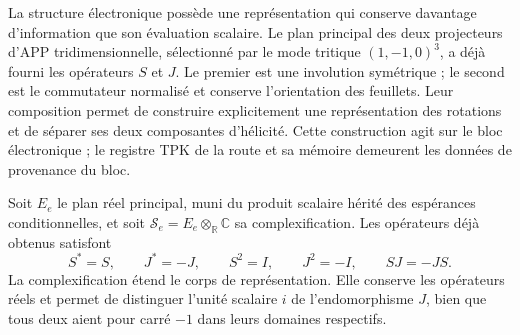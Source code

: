 La structure électronique possède une représentation qui conserve davantage
d'information que son évaluation scalaire. Le plan principal des deux
projecteurs d'APP tridimensionnelle, sélectionné par le mode tritique
\((1,-1,0)^3\), a déjà fourni les opérateurs \(S\) et \(J\).
Le premier est une involution symétrique ; le second est le commutateur
normalisé et conserve l'orientation des feuillets. Leur composition permet
de construire explicitement une représentation des rotations et de séparer ses
deux composantes d'hélicité. Cette construction agit sur le bloc
électronique ; le registre TPK de la route et sa mémoire demeurent les données
de provenance du bloc.

Soit \(E_e\) le plan réel principal, muni du produit scalaire hérité
des espérances conditionnelles, et soit
\(\mathscr S_e=E_e\otimes_{\mathbb R}\mathbb C\) sa complexification.
Les opérateurs déjà obtenus satisfont
\[
 S^*=S,\qquad J^*=-J,\qquad
 S^2=I,\qquad J^2=-I,\qquad SJ=-JS.
\]
La complexification étend le corps de représentation. Elle conserve les
opérateurs réels et permet de distinguer l'unité scalaire \(i\) de
l'endomorphisme \(J\), bien que tous deux aient pour carré \(-1\) dans leurs
domaines respectifs.

